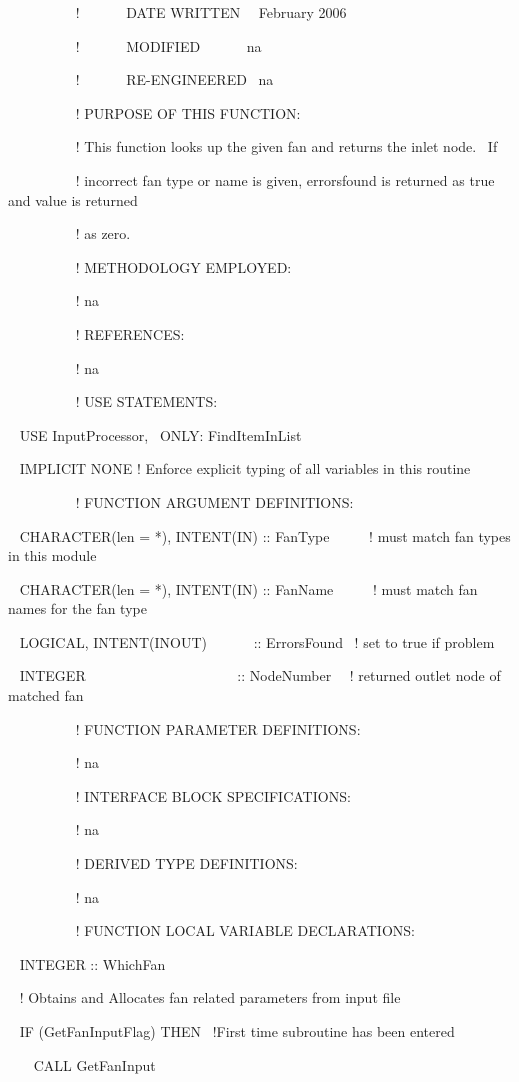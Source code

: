 ~~~~~~~~~ !~~~~~~ DATE WRITTEN~~ February 2006

~~~~~~~~~ !~~~~~~ MODIFIED~~~~~~ na

~~~~~~~~~ !~~~~~~ RE-ENGINEERED~ na

~~~~~~~~~ ! PURPOSE OF THIS FUNCTION:

~~~~~~~~~ ! This function looks up the given fan and returns the inlet node.~ If

~~~~~~~~~ ! incorrect fan type or name is given, errorsfound is returned as true and value is returned

~~~~~~~~~ ! as zero.

~~~~~~~~~ ! METHODOLOGY EMPLOYED:

~~~~~~~~~ ! na

~~~~~~~~~ ! REFERENCES:

~~~~~~~~~ ! na

~~~~~~~~~ ! USE STATEMENTS:

~ USE InputProcessor,~ ONLY: FindItemInList

~ IMPLICIT NONE ! Enforce explicit typing of all variables in this routine

~~~~~~~~~ ! FUNCTION ARGUMENT DEFINITIONS:

~ CHARACTER(len = *), INTENT(IN) :: FanType~~~~~ ! must match fan types in this module

~ CHARACTER(len = *), INTENT(IN) :: FanName~~~~~ ! must match fan names for the fan type

~ LOGICAL, INTENT(INOUT)~~~~~~ :: ErrorsFound~ ! set to true if problem

~ INTEGER~~ ~~~~~~~~~~~~~~~~~~~:: NodeNumber~~ ! returned outlet node of matched fan

~~~~~~~~~ ! FUNCTION PARAMETER DEFINITIONS:

~~~~~~~~~ ! na

~~~~~~~~~ ! INTERFACE BLOCK SPECIFICATIONS:

~~~~~~~~~ ! na

~~~~~~~~~ ! DERIVED TYPE DEFINITIONS:

~~~~~~~~~ ! na

~~~~~~~ ~~! FUNCTION LOCAL VARIABLE DECLARATIONS:

~ INTEGER :: WhichFan

~ ! Obtains and Allocates fan related parameters from input file

~ IF (GetFanInputFlag) THEN~ !First time subroutine has been entered

~~~ CALL GetFanInput

